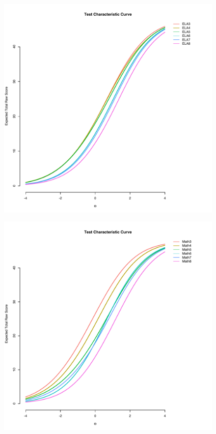 \documentclass[]{article}
\begin{document}
\begin{figure}
\centering
\includegraphics{tccs/ela_tccs.pdf}
\caption{}
\end{figure}

\begin{figure}
\centering
\includegraphics{tccs/math_tccs.pdf}
\caption{}
\end{figure}
\end{document}

